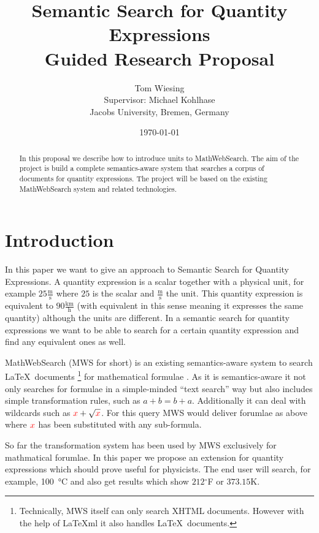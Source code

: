 \documentclass[11pt]{article}
\title{Semantic Search for Quantity Expressions\\ \vspace{2 mm} Guided Research Proposal}
\author{Tom Wiesing\\Supervisor: Michael Kohlhase\\Jacobs University, Bremen, Germany}
\date{\today}
\begin{document}
\maketitle
{}

\begin{abstract}
  In this proposal we describe how to introduce units to MathWebSearch. The aim of the project is build a complete semantics-aware system that searches a corpus of documents for quantity expressions. The project will be based on the existing MathWebSearch system and related technologies.
\end{abstract}

\section{Introduction}

In this paper we want to give an approach to Semantic Search for Quantity Expressions. A quantity expression is a scalar together with a physical unit, for example $25 \frac{\text{m}}{\text{s}}$ where $25$ is the scalar and $\frac{\text{m}}{\text{s}}$ the unit. This quantity expression is equivalent to $90 \frac{\text{km}}{\text{h}}$ (with equivalent in this sense meaning it expresses the same quantity) although the units are different. In a semantic search for quantity expressions we want to be able to search for a certain quantity expression and find any equivalent ones as well.

MathWebSearch (MWS for short) is an existing semantics-aware system to search \LaTeX \  documents \footnote{Technically, MWS itself can only search XHTML documents. However with the help of \LaTeX{}ml \cite{Miller:latexml:base} it also handles \LaTeX \ documents. } for mathematical formulae \cite{HamKohPro:man14}. As it is semantics-aware it not only searches for formulae in a simple-minded ``text search'' way but also includes simple transformation rules, such as $a + b = b + a$. Additionally it can deal with wildcards such as $ { \color{red} x} + \sqrt{\color{red} x}$. For this query MWS would deliver forumlae as above where $ { \color{red} x} $ has been substituted with any sub-formula.

So far the transformation system has been used by MWS exclusively for mathmatical forumlae. In this paper we propose an extension for quantity expressions which should prove useful for physicists.
The end user will search, for example, \SI{100}{\degreeCelsius} and also get results which show $212$$^\circ$F or $373.15$K.
\end{document}

